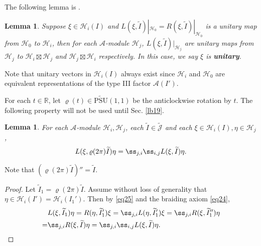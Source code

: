 \documentclass[12pt,a4paper,notitlepage]{article}
\theoremstyle{definition}
\theoremstyle{plain}
\newtheorem{lm}[df]{Lemma}
\newcommand{\mc}{\mathcal}
\newcommand{\wtd}{\widetilde}
\newcommand{\Jtd}{\widetilde{\mathcal J}}
\newcommand{\Rbb}{\mathbb R}
\newcommand{\UPSU}{\widetilde{\mathrm{PSU}}(1,1)}
\numberwithin{equation}{section}
\begin{document}
	
The following lemma is \cite[Lemma 6.1]{Gui21a}.
\begin{lm}\label{lb2}
Suppose $\xi\in\mc H_i(I)$ and $L(\xi,\wtd I)|_{\mc H_0}=R(\xi,\wtd I)|_{\mc H_0}$ is a unitary map from $\mc H_0$ to $\mc H_i$, then for each $\mc A$-module $\mc H_j$, $L(\xi,\wtd I)|_{\mc H_j}$ are unitary maps from $\mc H_j$ to $\mc H_i\boxtimes\mc H_j$ and $\mc H_j\boxtimes\mc H_i$ respectively. In this case, we say $\xi$ is \textbf{unitary}.
\end{lm}

Note that unitary vectors in $\mc H_i(I)$ always exist since $\mc H_i$ and $\mc H_0$ are equivalent representations of the  type III factor $\mc A(I')$.


For each $t\in\Rbb$, let $\varrho(t)\in\UPSU$ be the anticlockwise rotation by $t$. The following property will not be used until Sec. \ref{lb19}.

\begin{lm}\label{lb20}
For each $\mc A$-module $\mc H_i,\mc H_j$, each $\wtd I\in\Jtd$  and each $\xi\in\mc H_i(I),\eta\in\mc H_j$,
\begin{align}
L(\xi,\varrho(2\pi)\wtd I)\eta=\ss_{j,i}\ss_{i,j}L(\xi,\wtd I)\eta.	
\end{align}
\end{lm}

Note that $(\varrho(2\pi)\wtd I)''=\wtd I$.

\begin{proof}
Let $\wtd I_1=\varrho(2\pi)\wtd I$. Assume without loss of generality that $\eta\in\mc H_i(I')=\mc H_i(I_1')$. Then by \eqref{eq25} and the braiding axiom \eqref{eq24},
\begin{align*}
&L(\xi,\wtd I_1)\eta=R(\eta,\wtd I_1')\xi=\ss_{j,i}L(\eta,\wtd I_1')\xi=\ss_{j,i}R(\xi,\wtd I_1'')\eta\\
=&\ss_{j,i}R(\xi,\wtd I)\eta=\ss_{j,i}\ss_{i,j}L(\xi,\wtd I)\eta.
\end{align*}
\end{proof}
\end{document}
